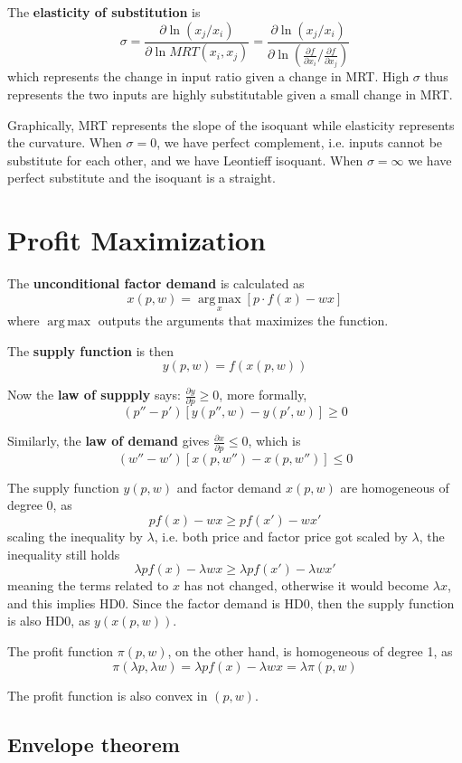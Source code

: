 \documentclass[twocolumn, fleqn]{article}
\newcommand{\argmax}{\operatorname*{arg\,max}}
\begin{document}
		The \textbf{elasticity of substitution} is 
		\[\sigma = \frac{\partial \ln(x_j/x_i)}{\partial \ln MRT(x_i, x_j)}= \frac{\partial \ln(x_j/x_i)}{\partial \ln (\frac{\partial f}{\partial x_i}/\frac{\partial f}{\partial x_j})}\]
		which represents the change in input ratio given a change in MRT. High $\sigma$ thus represents the two inputs are highly substitutable given a small change in MRT.
		
		Graphically, MRT represents the slope of the isoquant while elasticity represents the curvature. When $\sigma=0$, we have perfect complement, i.e. inputs cannot be substitute for each other, and we have Leontieff isoquant. When $\sigma = \infty$ we have perfect substitute and the isoquant is a straight. 
		
	\section{Profit Maximization}
		The \textbf{unconditional factor demand} is calculated as 
		\[x(p,w) = \argmax _x \left[ p \cdot f(x)-wx \right]\]
		where $\argmax$ outputs the arguments that maximizes the function.
		
		The \textbf{supply function} is then 
		\[y(p,w) = f(x(p,w))\]
		
		Now the \textbf{law of suppply} says: $\frac{\partial y}{\partial p} \geq 0$, more formally,
		\[(p''-p')[y(p'', w)-y(p',w)]\geq 0\]
		
		Similarly, the \textbf{law of demand} gives $\frac{\partial x}{\partial p} \leq 0$, which is 
		\[(w''-w')[x(p, w'')-x(p,w'')]\leq 0\]
		
		The supply function $y(p,w)$ and factor demand $x(p,w)$ are homogeneous of degree 0, as 
		\[pf(x) - wx \geq pf(x')-wx'\]
		scaling the inequality by $\lambda$, i.e. both price and factor price got scaled by $\lambda$, the inequality still holds
		\[\lambda pf(x) - \lambda wx \geq \lambda pf(x')- \lambda wx'\]
		meaning the terms related to $x$ has not changed, otherwise it would become $\lambda x$, and this implies HD0. Since the factor demand is HD0, then the supply function is also HD0, as $y(x(p,w))$.
		
		The profit function $\pi (p,w)$, on the other hand, is homogeneous of degree 1, as
		\[\pi(\lambda p,\lambda w)=\lambda pf(x) - \lambda wx = \lambda \pi(p,w)\]
		
		The profit function is also convex in $(p,w)$.
		
		\subsection{Envelope theorem}
		
\end{document}
